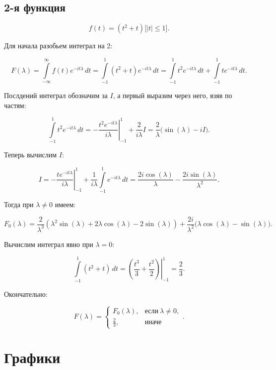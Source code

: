 \documentclass[12pt, a4paper]{article} %
\renewcommand{\le}{\leqslant}
\begin{document}
\subsection{2-я функция}

$$\displaystyle f(t) = (t^2+t)\bigl[|t| \le 1\bigr].$$

Для начала разобьем интеграл на 2:

\[
    F(\lambda) =
    \int\limits_{-\infty}^{\infty} f(t)e^{-it\lambda}\,dt =
    \int\limits_{-1}^{1} (t^2 + t) e^{-it\lambda}\,dt =
    \int\limits_{-1}^{1} t^2 e^{-it\lambda}\,dt +
    \int\limits_{-1}^{1} t e^{-it\lambda}\,dt
.\] 

Послдений интеграл обозначим за $I$, а первый выразим через него, взяв по частям:

 \[
    \int\limits_{-1}^{1} t^2 e^{-it\lambda}\,dt = 
    \left. -\frac{t^2e^{-it\lambda}}{i\lambda} \right|_{-1}^1 +
        \frac{2}{i\lambda} I =
    \frac{2}{\lambda}\bigl(\sin(\lambda) - iI\bigr)
.\]

Теперь вычислим $I$:

 \[
    I = \left. -\frac{te^{-it\lambda}}{i\lambda} \right|_{-1}^1 +
        \frac{1}{i\lambda} \int\limits_{-1}^{1} e^{-it\lambda}\,dt =
    \frac{2i\cos(\lambda)}{\lambda} - \frac{2i\sin(\lambda)}{\lambda^2}
.\] 

Тогда при $\lambda \neq 0$ имеем:

\begin{equation*}
    F_0(\lambda) = 
    \frac{2}{\lambda^3} \left( \lambda^2\sin(\lambda) + 2\lambda\cos(\lambda)
    - 2\sin(\lambda)\right) +
    \frac{2i}{\lambda^2} \bigl( \lambda\cos(\lambda) - \sin(\lambda)\bigr)
.\end{equation*}

Вычислим интеграл явно при $\lambda = 0$:

 \[
    \int\limits_{-1}^{1} (t^2 + t)\,dt = 
    \left. \left(\frac{t^3}{3} + \frac{t^2}{2}\right) \right|_{-1}^1 =
    \frac{2}{3}
.\]

Окончательно:

\[
    F(\lambda) = 
    \begin{cases}
        F_0(\lambda), &\text{если} \ \lambda \neq 0, \\
    \frac{2}{3}, & \text{иначе}
    \end{cases} 
.\] 

\section{Графики}
\end{document}
